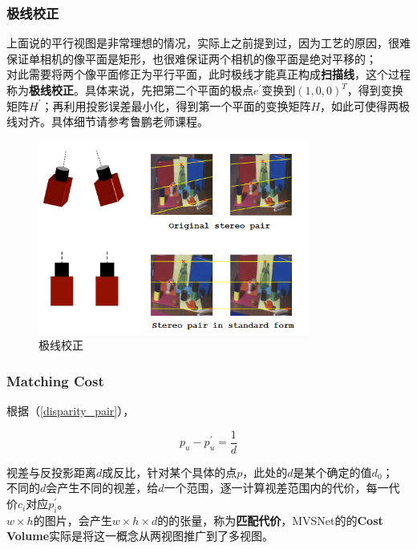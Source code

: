 		\subsubsection*{极线校正}
			上面说的平行视图是非常理想的情况，实际上之前提到过，因为工艺的原因，很难保证单相机的像平面是矩形，也很难保证两个相机的像平面是绝对平移的；\\

			对此需要将两个像平面修正为平行平面，此时极线才能真正构成\textbf{扫描线}，这个过程称为\textbf{极线校正}。具体来说，先把第二个平面的极点$e^\prime$变换到$(1,0,0)^T$，得到变换矩阵$H^\prime$；再利用投影误差最小化，得到第一个平面的变换矩阵$H$，如此可使得两极线对齐。具体细节请参考鲁鹏老师课程。
			\begin{figure}[H]
				\begin{center}
					\includegraphics[width=0.8\textwidth]{images/epipolar.png}
				\end{center}
				\caption{极线校正}
			\end{figure}

		\subsubsection*{Matching Cost}
			根据（\ref{disparity_pair}），

			$$
				p_u - p^\prime_u = \frac{1}{d}
			$$

			视差与反投影距离$d$成反比，针对某个具体的点$p$，此处的$d$是某个确定的值$d_0$；\\

			不同的$d$会产生不同的视差，给$d$一个范围，逐一计算视差范围内的代价，每一代价$c_i$对应$p_i^\prime$。\\

			$w\times h$的图片，会产生$w\times h\times d$的的张量，称为\textbf{匹配代价}，MVSNet的的\textbf{Cost Volume}实际是将这一概念从两视图推广到了多视图。\\

